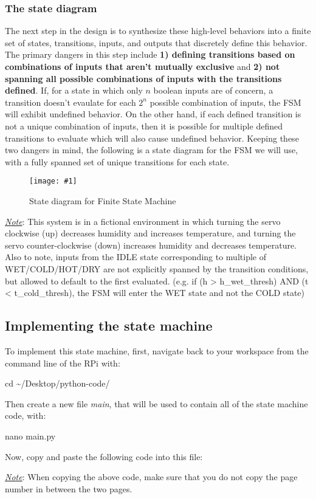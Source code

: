 \documentclass{article}
\newcommand*{\myfont}{\fontfamily{pcr}\selectfont}
\newcommand{\codeb}[2]{
  \begin{tcolorbox}[width=\textwidth,colback={SpringGreen},title={#1},colbacktitle=darkgreen,coltitle=SpringGreen]
    \myfont
    #2
  \end{tcolorbox}
} %
\newcommand{\imagefigb}[2]{
    \begin{figure}[H]
        \centering
        \texttt{[image: \#1]}
        \caption{#2}
    \end{figure}
}
\newcommand{\note}[1]{\underline{\textit{Note}}: #1}
\begin{document}
    \subsubsection{The state diagram}
      The next step in the design is to synthesize these high-level behaviors into a finite set of states, transitions, inputs, and outputs that discretely define this behavior. The primary dangers in this step include \textbf{1) defining transitions based on combinations of inputs that aren't mutually exclusive} and \textbf{2) not spanning all possible combinations of inputs with the transitions defined}. If, for a state in which only $n$ boolean inputs are of concern, a transition doesn't evaulate for each $2^n$ possible combination of inputs, the FSM will exhibit undefined behavior. On the other hand, if each defined transition is not a unique combination of inputs, then it is possible for multiple defined transitions to evaluate which will also cause undefined behavior. Keeping these two dangers in mind, the following is a state diagram for the FSM we will use, with a fully spanned set of unique transitions for each state.
      \imagefigb{fsm-slab.png}{State diagram for Finite State Machine}
      \noindent
      \note{This system is in a fictional environment in which turning the servo clockwise (up) decreases humidity and increases temperature, and turning the servo counter-clockwise (down) increases humidity and decreases temperature. Also to note, inputs from the IDLE state corresponding to multiple of WET/COLD/HOT/DRY are not explicitly spanned by the transition conditions, but allowed to default to the first evaluated. (e.g. if (h > h\_wet\_thresh) AND (t < t\_cold\_thresh), the FSM will enter the WET state and not the COLD state)}
  \subsection{Implementing the state machine}
    To implement this state machine, first, navigate back to your workspace from the command line of the RPi with:
    \codeb{Navigate to your workpsace}
    {
      cd \textasciitilde/Desktop/python-code/
    }
    Then create a new file \textit{main}, that will be used to contain all of the state machine code, with:
    \codeb{Create main Python FSM file}
    {
      nano main.py
    }
    Now, copy and paste the following code into this file:

    
    \underline{\textit{Note}}: When copying the above code, make sure that you do not copy the page number in between the two pages.
\end{document}
